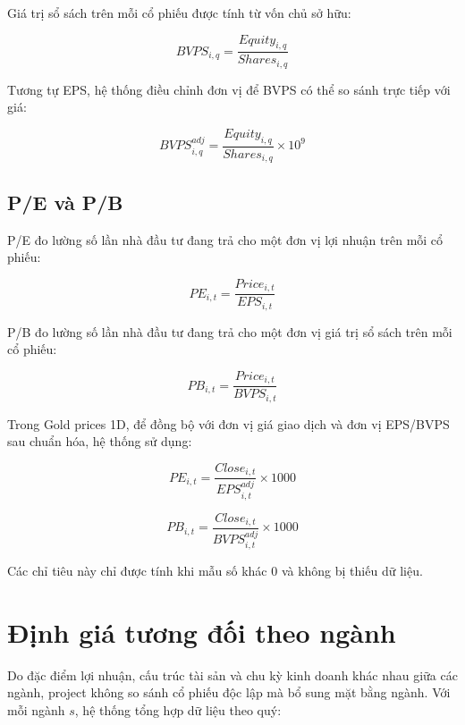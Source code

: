 \documentclass[12pt,a4paper]{article}
\begin{document}
Giá trị sổ sách trên mỗi cổ phiếu được tính từ vốn chủ sở hữu:

\begin{equation}
    BVPS_{i,q} = \frac{Equity_{i,q}}{Shares_{i,q}}
\end{equation}

Tương tự EPS, hệ thống điều chỉnh đơn vị để BVPS có thể so sánh trực tiếp với giá:

\begin{equation}
    BVPS^{adj}_{i,q} = \frac{Equity_{i,q}}{Shares_{i,q}} \times 10^9
\end{equation}

\subsection{P/E và P/B}

P/E đo lường số lần nhà đầu tư đang trả cho một đơn vị lợi nhuận trên mỗi cổ phiếu:

\begin{equation}
    PE_{i,t} = \frac{Price_{i,t}}{EPS_{i,t}}
\end{equation}

P/B đo lường số lần nhà đầu tư đang trả cho một đơn vị giá trị sổ sách trên mỗi cổ phiếu:

\begin{equation}
    PB_{i,t} = \frac{Price_{i,t}}{BVPS_{i,t}}
\end{equation}

Trong Gold prices 1D, để đồng bộ với đơn vị giá giao dịch và đơn vị EPS/BVPS sau chuẩn hóa, hệ thống sử dụng:

\begin{equation}
    PE_{i,t} = \frac{Close_{i,t}}{EPS^{adj}_{i,t}} \times 1000
\end{equation}

\begin{equation}
    PB_{i,t} = \frac{Close_{i,t}}{BVPS^{adj}_{i,t}} \times 1000
\end{equation}

Các chỉ tiêu này chỉ được tính khi mẫu số khác 0 và không bị thiếu dữ liệu.

\section{Định giá tương đối theo ngành}

Do đặc điểm lợi nhuận, cấu trúc tài sản và chu kỳ kinh doanh khác nhau giữa các ngành, project không so sánh cổ phiếu độc lập mà bổ sung mặt bằng ngành. Với mỗi ngành $s$, hệ thống tổng hợp dữ liệu theo quý:
\end{document}
